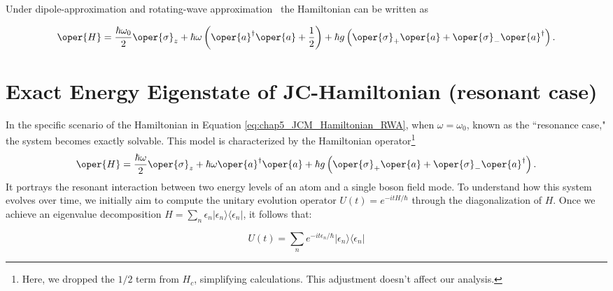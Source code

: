 Under dipole-approximation and rotating-wave approximation~\cite[Chap 2]{Bina_JC_tutorial} the Hamiltonian can be written as
\begin{mdframed}
\begin{equation}
        \label{eq:chap5_JCM_Hamiltonian_RWA}
        \oper{H} = \frac{\hbar \omega_0}{2} \oper{\sigma}_z + \hbar \omega \left(\oper{a}^\dagger \oper{a} + \frac{1}{2}\right) 
        + \hbar g \left(\oper{\sigma}_+ \oper{a} + \oper{\sigma}_- \oper{a}^\dagger\right).
\end{equation}
\end{mdframed}

\section[Exact Energy Eigenstate of JC-Hamiltonian]{Exact Energy Eigenstate of JC-Hamiltonian (resonant case)}

In the specific scenario of the Hamiltonian in Equation \ref{eq:chap5_JCM_Hamiltonian_RWA}, when 
\(\omega  = \omega_0\), known as the 
``resonance case," the system becomes exactly solvable.
This model is characterized by the Hamiltonian operator\footnote{Here, we dropped the \(1/2\) term from \(H_c\), 
simplifying calculations. This adjustment doesn't affect our analysis.}
\begin{equation}
        \label{eq:chap5_JCM_Hamiltonian_resonance}
        \oper{H} = \frac{\hbar\omega}{2} \oper{\sigma}_z + \hbar \omega \oper{a}^\dagger \oper{a}
        + \hbar g \left(\oper{\sigma}_+ \oper{a} + \oper{\sigma}_- \oper{a}^\dagger\right). 
\end{equation}
It portrays the resonant interaction between two energy levels of an atom and a single boson field mode.
To understand how this system evolves over time, we initially aim to compute the unitary evolution operator 
$U(t) = e^{-i t H/\hbar}$ through the diagonalization of $H$. Once we achieve an eigenvalue decomposition 
$H = \sum_n \epsilon_n \lvert \epsilon_n \rangle \langle \epsilon_n \rvert$, it follows that:

\begin{equation}
U(t) = \sum_n e^{-i t \epsilon_n/\hbar} \lvert \epsilon_n \rangle \langle \epsilon_n \rvert
\end{equation}

